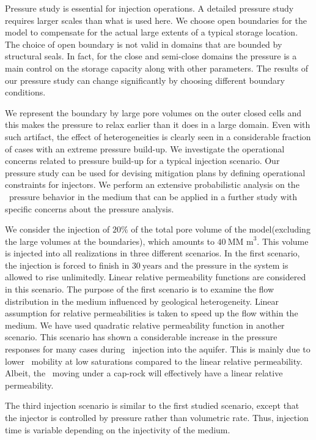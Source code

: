 Pressure study is essential for injection operations. A detailed pressure study requires larger scales than what is used here. We choose open boundaries for the model to compensate for the actual large extents of a typical storage location. The choice of open boundary is not valid in domains that are bounded by structural seals. In fact, for the close and semi-close domains the pressure is a main control on the storage capacity along with other parameters. The results of our pressure study can change significantly by choosing different boundary conditions. 

We represent the boundary by large pore volumes on the outer closed cells and this makes the pressure to relax earlier than it does in a large domain. Even with such artifact, the effect of heterogeneities is clearly seen in a considerable fraction of cases with an extreme pressure build-up. We investigate the operational concerns  related to pressure build-up for a typical injection scenario. Our pressure study can be used for devising mitigation plans by defining operational constraints for injectors. We perform an extensive probabilistic analysis on the \coo\ pressure behavior in the medium that can be applied in a further study with specific concerns about the pressure analysis.   

We consider the injection of $20\%$ of the total pore volume of the model(excluding the large volumes at the boundaries), which amounts to $40~\mbox{MM m}^3$. This volume is injected into all realizations
in three different scenarios. In the first scenario, the injection is forced to
finish in
$30~\mbox{years}$ and the pressure in the system is allowed to rise
unlimitedly. Linear relative permeability functions are considered in this
scenario. The purpose of the first scenario is to examine the flow distribution in the medium influenced by geological heterogeneity. Linear assumption for
relative permeabilities is taken to speed up the flow within the medium. We have used quadratic relative permeability function in another scenario. This scenario has shown a considerable increase in the pressure responses for many cases during \coo\ injection into the  aquifer. This is mainly due to lower \coo\ mobility at low saturations compared to the linear relative permeability. Albeit, the \coo\ moving under a cap-rock will effectively have a linear relative permeability.

The third injection scenario is similar to the first studied scenario, except that the injector is controlled by pressure rather than volumetric rate. Thus, injection time is variable depending on the injectivity of the medium.

